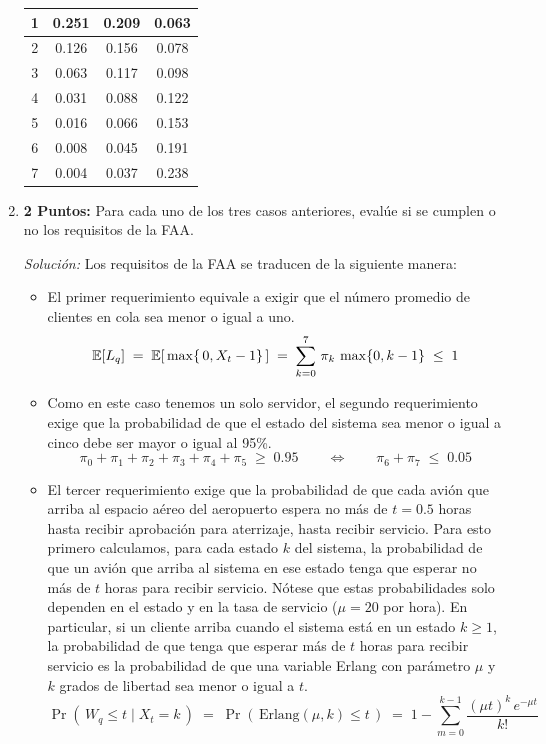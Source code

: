 \documentclass[ a4paper, twoside, 11pt]{article}
\begin{document}
\begin{problem}
\begin{enumerate}[label=\textbf{\alph*)}]
\begin{table}[htb]
\begin{tabular}{|c|c|c|c|}
1 & 0.251 & 0.209 & 0.063 \\ \hline
2 & 0.126 & 0.156 & 0.078 \\ \hline
3 & 0.063 & 0.117 & 0.098 \\ \hline
4 & 0.031 & 0.088 & 0.122 \\ \hline
5 & 0.016 & 0.066 & 0.153 \\ \hline
6 & 0.008 & 0.045 & 0.191 \\ \hline
7 & 0.004 & 0.037 & 0.238 \\ \hline
\end{tabular}
\end{table}

\item \textbf{2 Puntos:} Para cada uno de los tres casos anteriores, eval\'ue si se cumplen o no los requisitos de la FAA. 

\emph{Soluci\'on:} Los requisitos de la FAA se traducen de la siguiente manera: 
\begin{itemize}
\item El primer requerimiento equivale a exigir que el n\'umero promedio de clientes en cola sea menor o igual a uno. \Iec
\[
\mathbb{E}[L_q] \; = \; \mathbb{E}[ \, \max \{ \, 0, X_t - 1 \} \, ]
\; = \; \sum_{k=0}^7 \, \pi_k \, \max \{ 0, k-1 \} \; \leq \; 1
\]
\item Como en este caso tenemos un solo servidor, el segundo requerimiento exige que la probabilidad de que el estado del sistema sea menor o igual a cinco debe ser mayor o igual al 95\%. \Iec
\[
\pi_0 + \pi_1 + \pi_2 + \pi_3 + \pi_4 + \pi_5 \; \geq \; 0.95
\qquad
\Longleftrightarrow
\qquad
\pi_6 + \pi_7 \; \leq \; 0.05
\]
\item El tercer requerimiento exige que la probabilidad de que cada avi\'on que arriba al espacio a\'ereo del aeropuerto espera no m\'as de $t = 0.5$ horas hasta recibir aprobaci\'on para aterrizaje, \ie hasta recibir servicio. Para esto primero calculamos, para cada estado $k$ del sistema, la probabilidad de que un avi\'on que arriba al sistema en ese estado tenga que esperar no m\'as de $t$ horas para recibir servicio. N\'otese que estas probabilidades solo dependen en el estado y en la tasa de servicio ($\mu = 20$ por hora). En particular, si un cliente arriba cuando el sistema est\'a en un estado $k \geq 1$, la probabilidad de que tenga que esperar m\'as de $t$ horas para recibir servicio es la probabilidad de que una variable Erlang con par\'ametro $\mu$ y $k$ grados de libertad sea menor o igual a $t$. \Iec
\[
\Pr( \, W_q \leq t \mid X_t = k \, ) \; = \; 
\Pr( \, \text{Erlang}(\mu,k) \leq t \, ) \; = \; 
1 - \sum_{m=0}^{k-1} \frac{ ( \mu t )^k \, e^{-\mu t} }{k!}
\]


\end{itemize}
\end{enumerate}
\end{problem}
\end{document}
